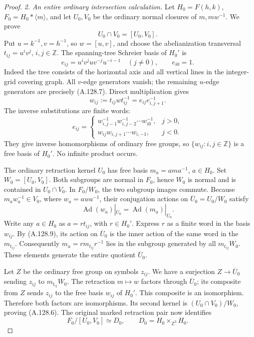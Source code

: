 \begin{proof}
\emph{2. An entire ordinary intersection calculation.}
Let \(H_0=F(h,k)\), \(F_0=H_0*\langle m\rangle\), and
let \(U_0,V_0\) be the ordinary normal closures of
\(m,mw^{-1}\). We prove
\[
             U_0\cap V_0=[U_0,V_0].                       \tag{A.128.6}
\]
Put \(u=k^{-1},v=h^{-1}\), so \(w=[u,v]\), and choose the
abelianization transversal \(t_{ij}=u^iv^j\),
\(i,j\in\mathbb Z\). The spanning-tree Schreier basis of
\(H_0'\) is
\[
 e_{ij}=u^iv^j u v^{-j}u^{-i-1}\quad(j\ne0),\qquad e_{i0}=1.
                                                        \tag{A.128.7}
\]
Indeed the tree consists of the horizontal axis and all
vertical lines in the integer-grid covering graph. All
\(v\)-edge generators vanish; the remaining \(u\)-edge
generators are precisely (A.128.7).
Direct multiplication gives
\[
 w_{ij}:=t_{ij}wt_{ij}^{-1}=e_{ij}e_{i,j+1}^{-1}.
\]
The inverse substitutions are finite words:
\[
 e_{ij}=\begin{cases}
 w_{i,j-1}^{-1}w_{i,j-2}^{-1}\cdots w_{i0}^{-1},&j>0,\\
 w_{ij}w_{i,j+1}\cdots w_{i,-1},&j<0.
 \end{cases}                                             \tag{A.128.8}
\]
They give inverse homomorphisms of ordinary free groups, so
\(\{w_{ij}:i,j\in\mathbb Z\}\) is a free basis of \(H_0'\).
No infinite product occurs.

The ordinary retraction kernel \(U_0\) has free basis
\(m_a=ama^{-1}\), \(a\in H_0\). Set \(W_0=[U_0,V_0]\).
Both subgroups are normal in \(F_0\), hence \(W_0\) is
normal and is contained in \(U_0\cap V_0\). In
\(F_0/W_0\), the two subgroup images commute. Because
\(m_aw_a^{-1}\in V_0\), where \(w_a=awa^{-1}\), their
conjugation actions on \(\overline U_0=U_0/W_0\) satisfy
\[
 \operatorname{Ad}(w_a)|_{\overline U_0}
       =\operatorname{Ad}(m_a)|_{\overline U_0}.            \tag{A.128.9}
\]
Write any \(a\in H_0\) as \(a=r t_{ij}\), with
\(r\in H_0'\). Express \(r\) as a finite word in the basis
\(w_{ij}\). By (A.128.9), its action on \(\overline U_0\)
is the inner action of the same word in the \(m_{t_{ij}}\).
Consequently \(m_a=r m_{t_{ij}}r^{-1}\) lies in the subgroup
generated by all \(m_{t_{ij}}W_0\). These elements generate
the entire quotient \(\overline U_0\).

Let \(Z\) be the ordinary free group on symbols \(z_{ij}\).
We have a surjection \(Z\to\overline U_0\) sending
\(z_{ij}\) to \(m_{t_{ij}}W_0\). The retraction \(m\mapsto w\)
factors through \(\overline U_0\); its composite from \(Z\)
sends \(z_{ij}\) to the free basis \(w_{ij}\) of \(H_0'\).
This composite is an isomorphism. Therefore both factors are
isomorphisms. Its second kernel is
\((U_0\cap V_0)/W_0\), proving (A.128.6).
The original marked retraction pair now identifies
\[
 F_0/[U_0,V_0]\simeq D_0,
 \qquad D_0=H_0\times_{\mathbb Z^2}H_0.                    \tag{A.128.10}
\]


\end{proof}
